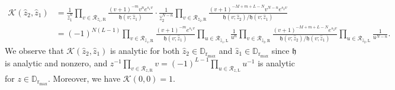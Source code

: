 \documentclass{article}
\numberwithin{equation}{section}
\newcommand{\LL}{\mathrm{L}}
\newcommand{\RR}{\mathrm{R}}
\newcommand{\rr}{\mathrm{r_{max}}}
\begin{document}
\begin{equation}
	\begin{split}
	\mathcal{K}(\hat z_2,\hat z_1)&= \frac{1}{\hat z_1^{n}}\prod_{v\in\mathcal{R}_{\hat z_1,\RR}}\frac{(v+1)^{-m}v^{n}e^{s_1v}}{\mathfrak{h}(v;\hat z_1)}\cdot
	\frac{1}{\hat z_2^{N-n}}\prod_{v\in\mathcal{R}_{\hat z_2,\RR}}\frac{(v+1)^{-M+m+L-N}v^{N-n}e^{s_2v}}{\mathfrak{h}(v;\hat z_2)/\mathfrak{h}(v;\hat z_1)}\\
	&=(-1)^{N(L-1)}\prod_{v\in\mathcal{R}_{\hat z_1,\RR}}\frac{(v+1)^{-m}e^{s_1v}}{\mathfrak{h}(v;\hat z_1)}
	\prod_{u\in\mathcal{R}_{\hat z_1,\LL}}\frac{1}{u^n}
	\prod_{v\in\mathcal{R}_{\hat z_2,\RR}}\frac{(v+1)^{-M+m+L-N}e^{s_2v}}{\mathfrak{h}(v;\hat z_2)/\mathfrak{h}(v;\hat z_1)}
	\prod_{u\in\mathcal{R}_{\hat z_2,\LL}}\frac{1}{u^{N-n}}.
	\end{split}
\end{equation}
We observe that $\mathcal{K}(\hat z_2,\hat z_1)$ is analytic for both $\hat z_2\in\mathbb{D}_\rr$ and $\hat z_1\in\mathbb{D}_\rr$ since $\mathfrak{h}$ is analytic and nonzero, and $z^{-1}\prod_{v\in\mathcal{R}_{z,\RR}}v = (-1)^{L-1} \prod_{u\in\mathcal{R}_{z,\LL}} u^{-1}$ is analytic for $z\in\mathbb{D}_\rr$. Moreover, we have $\mathcal{K}(0,0)=1$.
\end{document}
